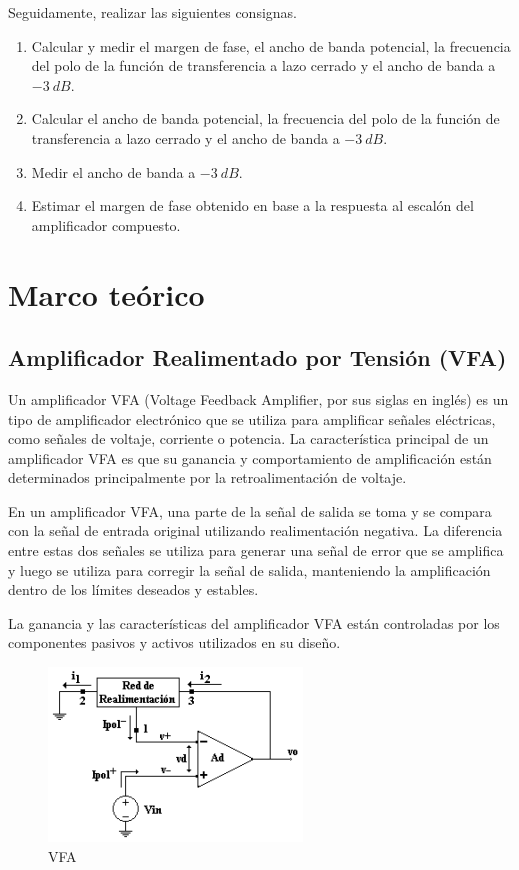 \documentclass[12pt,A4paper,titlepage]{article}
\begin{document}
\hspace{1mm} Seguidamente, realizar las siguientes consignas.
\begin{enumerate}[label=\alph*.]
    \item Calcular y medir el margen de fase, el ancho de banda potencial, la frecuencia del polo de la función de transferencia a lazo cerrado y el ancho de banda a \(-3~dB\).
    \item Calcular el ancho de banda potencial, la frecuencia del polo de la función de transferencia a lazo cerrado y el ancho de banda a \(-3~dB\).
    \item Medir el ancho de banda a \(-3~dB\).
    \item Estimar el margen de fase obtenido en base a la respuesta al escalón del amplificador compuesto.
\end{enumerate}

\newpage
\section{Marco teórico}

\subsection{Amplificador Realimentado por Tensión (VFA)}

\hspace{1mm} Un amplificador VFA (Voltage Feedback Amplifier, por sus siglas en inglés) es un tipo de amplificador electrónico que se utiliza para amplificar señales eléctricas, como señales de voltaje, corriente o potencia. La característica principal de un amplificador VFA es que su ganancia y comportamiento de amplificación están determinados principalmente por la retroalimentación de voltaje.

\bigskip 
\hspace{1mm} En un amplificador VFA, una parte de la señal de salida se toma y se compara con la señal de entrada original utilizando realimentación negativa. La diferencia entre estas dos señales se utiliza para generar una señal de error que se amplifica y luego se utiliza para corregir la señal de salida, manteniendo la amplificación dentro de los límites deseados y estables.

\bigskip 
\hspace{1mm} La ganancia y las características del amplificador VFA están controladas por los componentes pasivos y activos utilizados en su diseño.

\bigskip
\begin{figure}[!h]
    \centering
    \includegraphics[scale=1]{Imagenes/VFA.png}
    \caption{VFA}
\end{figure}
\end{document}
